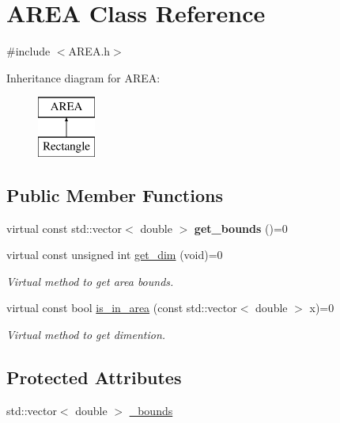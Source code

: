 \hypertarget{class_a_r_e_a}{}\section{A\+R\+EA Class Reference}
\label{class_a_r_e_a}


{\ttfamily \#include $<$A\+R\+E\+A.\+h$>$}

Inheritance diagram for A\+R\+EA\+:\begin{figure}[H]
\begin{center}
\leavevmode
\includegraphics[height=2.000000cm]{class_a_r_e_a}
\end{center}
\end{figure}
\subsection*{Public Member Functions}
\begin{DoxyCompactItemize}
\item 
\mbox{\label{class_a_r_e_a_a5319102dccffc30508afbbbfbf572f65}} 
virtual const std\+::vector$<$ double $>$ {\bfseries get\+\_\+bounds} ()=0
\item 
\mbox{\label{class_a_r_e_a_a69de83115e3a6bdbd2bb67bd1608d83a}} 
virtual const unsigned int \hyperlink{class_a_r_e_a_a69de83115e3a6bdbd2bb67bd1608d83a}{get\+\_\+dim} (void)=0
\begin{DoxyCompactList}\small\item\em Virtual method to get area bounds. \end{DoxyCompactList}\item 
\mbox{\label{class_a_r_e_a_a325ab2d7accb6774bb9f1a34548e0906}} 
virtual const bool \hyperlink{class_a_r_e_a_a325ab2d7accb6774bb9f1a34548e0906}{is\+\_\+in\+\_\+area} (const std\+::vector$<$ double $>$ x)=0
\begin{DoxyCompactList}\small\item\em Virtual method to get dimention. \end{DoxyCompactList}\end{DoxyCompactItemize}
\subsection*{Protected Attributes}
\begin{DoxyCompactItemize}
\item 
std\+::vector$<$ double $>$ \hyperlink{class_a_r_e_a_a9c56910797786fb4d97e42c7829798b7}{\+\_\+bounds}
\end{DoxyCompactItemize}


